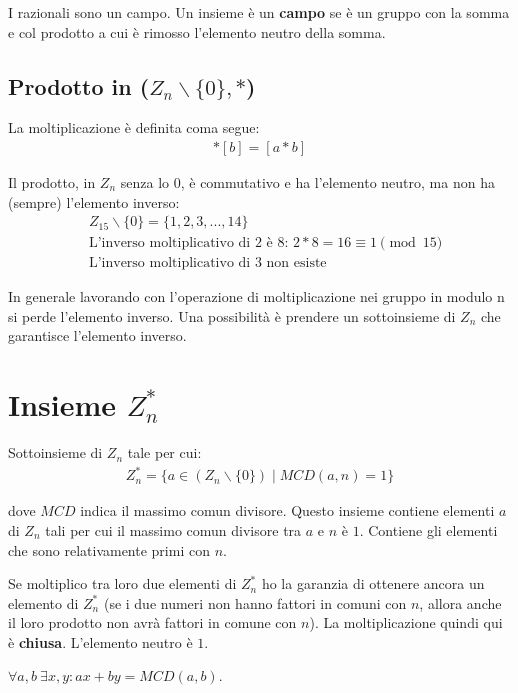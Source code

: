 I razionali sono un campo. Un insieme è un \textbf{campo} se è un gruppo con la somma e col prodotto a cui è rimosso l'elemento neutro della somma.

\subsection{Prodotto in ($Z_n \backslash \{0\}, *$)} La moltiplicazione è definita coma segue:
\begin{align*}
    [a] * [b] = [a*b]
\end{align*}

\noindent Il prodotto, in $Z_n$ senza lo $0$, è commutativo e ha l'elemento neutro, ma non ha (sempre) l'elemento inverso:
\begin{align*}
    &Z_{15} \backslash \{0\} = \{1, 2, 3, ..., 14\}\\
    &\text{L'inverso moltiplicativo di $2$ è $8$: }2*8 = 16 \equiv 1 \pmod{15}\\
    &\text{L'inverso moltiplicativo di $3$ non esiste}
\end{align*}

\noindent In generale lavorando con l'operazione di moltiplicazione nei gruppo in modulo n si perde l'elemento inverso. Una possibilità è prendere un sottoinsieme di $Z_n$ che garantisce l'elemento inverso.

\section{Insieme $Z^*_n$}
Sottoinsieme di $Z_n$ tale per cui:
\begin{align*}
    Z^*_n = \{a \in (Z_n \backslash \{0\}) \mid MCD(a, n) = 1 \}
\end{align*}

\noindent dove $MCD$ indica il massimo comun divisore. Questo insieme contiene elementi $a$ di $Z_n$ tali per cui il massimo comun divisore tra $a$ e $n$ è $1$. Contiene gli elementi che sono relativamente primi con $n$. 

Se moltiplico tra loro due elementi di $Z^*_n$ ho la garanzia di ottenere ancora un elemento di $Z^*_n$ (se i due numeri non hanno fattori in comuni con $n$, allora anche il loro prodotto non avrà fattori in comune con $n$). La moltiplicazione quindi qui è \textbf{chiusa}. L'elemento neutro è $1$.

\begin{theorem}
    \(\forall a, b \  \exists x, y : ax + by = MCD(a, b)\).
\end{theorem}

